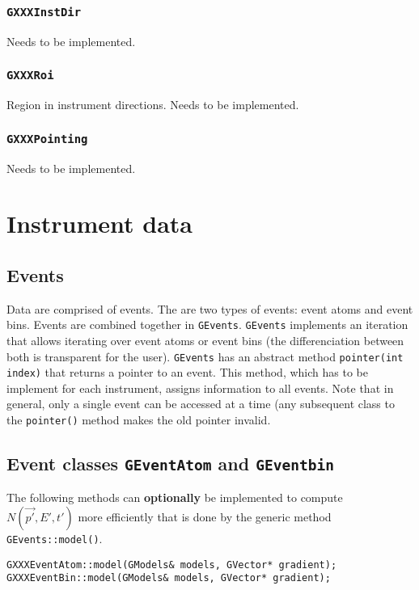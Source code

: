 \documentclass{article}[12pt,a4]
\begin{document}
\subsubsection{{\tt GXXXInstDir}}

Needs to be implemented.


\subsubsection{{\tt GXXXRoi}}

Region in instrument directions.
Needs to be implemented.


\subsubsection{{\tt GXXXPointing}}

Needs to be implemented.


\section{Instrument data}

\subsection{Events}

Data are comprised of events.
The are two types of events: event atoms and event bins.
Events are combined together in {\tt GEvents}.
{\tt GEvents} implements an iteration that allows iterating over event atoms or event bins
(the differenciation between both is transparent for the user).
{\tt GEvents} has an abstract method {\tt pointer(int index)} that returns a pointer to an
event.
This method, which has to be implement for each instrument, assigns information to
all events.
Note that in general, only a single event can be accessed at a time (any subsequent
class to the {\tt pointer()} method makes the old pointer invalid.

\subsection{Event classes {\tt GEventAtom} and {\tt GEventbin}}

The following methods can {\bf optionally} be implemented to compute $N(\vec{p'}, E', t')$
more efficiently that is done by the generic method {\tt GEvents::model()}.

\begin{verbatim}
GXXXEventAtom::model(GModels& models, GVector* gradient);
GXXXEventBin::model(GModels& models, GVector* gradient);
\end{verbatim}
\end{document}
